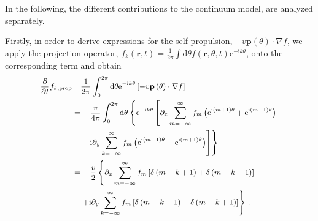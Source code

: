 \documentclass[10pt,aspectratio=43,mathserif,table]{beamer}
\begin{document}
\begin{frame}
    \small
    In the following, the different contributions to the continuum model, are analyzed separately.

    Firstly, in order to derive expressions for the self-propulsion, $-v\mathbf{p}\left( \theta \right) \cdot \nabla f$, we apply the projection operator, $f _{k}\left( \mathbf{r},t \right) =\frac{1}{2\pi}\int{\mathrm{d}\theta f \left( \mathbf{r},\theta ,t \right) \mathrm{e}^{-\mathrm{i}k\theta}}$, onto the corresponding term and obtain
    \begin{equation}
        \small
        \begin{aligned}
            \frac{\partial}{\partial t}f_{k,\mathrm{prop}}=&\frac{1}{2\pi}\int_0^{2\pi}{\mathrm{d}\theta \mathrm{e}^{-\mathrm{i}k\theta}\left[ -v\mathbf{p}\left( \theta \right) \cdot \nabla f \right]}\\
            =&-\frac{v}{4\pi}\int_0^{2\pi}{\mathrm{d}\theta \left\{ \mathrm{e}^{-\mathrm{i}k\theta}\left[ \partial _x\sum_{m=-\infty}^{\infty}{f_m\left( \mathrm{e}^{\mathrm{i}\left( m+1 \right) \theta}+\mathrm{e}^{\mathrm{i}\left( m-1 \right) \theta} \right)} \right. \right.}\\
            &\left. \left. +\mathrm{i}\partial _y\sum_{k=-\infty}^{\infty}{f_m\left( \mathrm{e}^{\mathrm{i}\left( m-1 \right) \theta}-\mathrm{e}^{\mathrm{i}\left( m+1 \right) \theta} \right)} \right] \right\}\\
            =&-\frac{v}{2}\left\{ \partial _x\sum_{m=-\infty}^{\infty}{f_m\left[ \delta \left( m-k+1 \right) +\delta \left( m-k-1 \right) \right]} \right.\\
            &\left. +\mathrm{i}\partial _y\sum_{k=-\infty}^{\infty}{f_m\left[ \delta \left( m-k-1 \right) -\delta \left( m-k+1 \right) \right]} \right\} \;.\\
        \end{aligned}
    \end{equation}
\end{frame}
\end{document}
